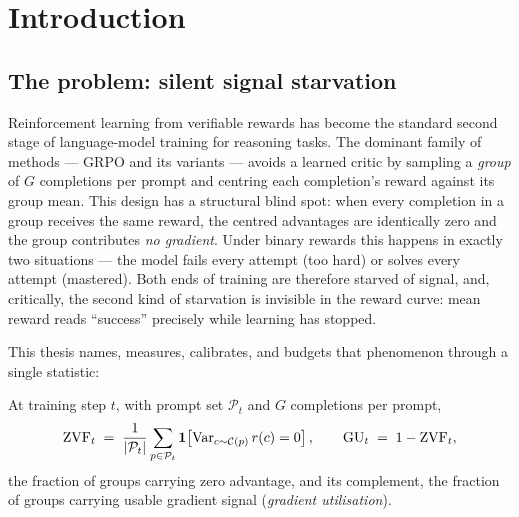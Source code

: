 \chapter{Introduction}
\label{ch:intro}

\section{The problem: silent signal starvation}
Reinforcement learning from verifiable rewards has become the standard second
stage of language-model training for reasoning tasks. The dominant family of
methods --- GRPO and its variants --- avoids a learned critic by sampling a
\emph{group} of $G$ completions per prompt and centring each completion's
reward against its group mean. This design has a structural blind spot: when
every completion in a group receives the same reward, the centred advantages
are identically zero and the group contributes \emph{no gradient}. Under
binary rewards this happens in exactly two situations --- the model fails
every attempt (too hard) or solves every attempt (mastered). Both ends of
training are therefore starved of signal, and, critically, the second kind of
starvation is invisible in the reward curve: mean reward reads ``success''
precisely while learning has stopped.

This thesis names, measures, calibrates, and budgets that phenomenon through a
single statistic:

\begin{definition}
At training step $t$, with prompt set $\mathcal{P}_t$ and $G$ completions per
prompt,
\[
\mathrm{ZVF}_t \;=\; \frac{1}{|\mathcal{P}_t|}\sum_{p\in\mathcal{P}_t}
\mathbf{1}\!\left[\operatorname{Var}_{c\sim\mathcal{C}(p)} r(c) = 0\right],
\qquad \mathrm{GU}_t \;=\; 1-\mathrm{ZVF}_t ,
\]
the fraction of groups carrying zero advantage, and its complement, the
fraction of groups carrying usable gradient signal (\emph{gradient
utilisation}).
\end{definition}

